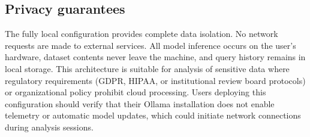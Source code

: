 \subsection{Privacy guarantees}

The fully local configuration provides complete data isolation. No network
requests are made to external services. All model inference occurs on
the user's hardware, dataset contents never leave the machine, and query
history remains in local storage. This architecture is suitable for
analysis of sensitive data where regulatory requirements (GDPR,
HIPAA, or institutional review board protocols) or organizational policy
prohibit cloud processing. Users deploying this configuration should
verify that their Ollama installation does not enable telemetry or
automatic model updates, which could initiate network connections during
analysis sessions.

